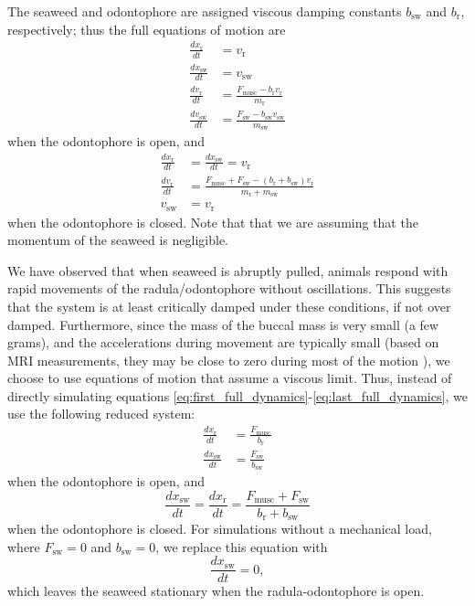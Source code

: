The seaweed and odontophore are assigned viscous damping constants
$b_\textrm{sw}$ and $b_\textrm{r}$, respectively; thus the full equations of motion are
\begin{align}
    \frac{dx_\textrm{r}}{dt} &= v_\textrm{r}\label{eq:first_full_dynamics}\\
    \frac{dx_\textrm{sw}}{dt} &= v_\textrm{sw}\\
    \frac{dv_\textrm{r}}{dt} &= \frac{F_\textrm{musc} - b_\textrm{r} v_\textrm{r}}{m_\textrm{r}}\\
    \frac{dv_\textrm{sw}}{dt} &= \frac{F_\textrm{sw} - b_\textrm{sw} v_\textrm{sw}}{m_\textrm{sw}}
\end{align}
when the odontophore is open, and
\begin{align}
    \frac{dx_\textrm{r}}{dt} &= \frac{dx_\textrm{sw}}{dt} = v_\textrm{r}\\
    \frac{dv_\textrm{r}}{dt} &= \frac{F_\textrm{musc} + F_\textrm{sw} - (b_\textrm{r} + b_\textrm{sw}) v_\textrm{r}}{m_\textrm{r} + m_\textrm{sw}}\\
    v_\textrm{sw} &= v_\textrm{r}\label{eq:last_full_dynamics}
\end{align}
when the odontophore is closed.  Note that that we are assuming that the
momentum of the seaweed is negligible.

We have observed that when seaweed is abruptly pulled, animals respond with
rapid movements of the radula/odontophore without oscillations. This suggests
that the system is at least critically damped under these conditions, if not
over damped. Furthermore, since the mass of the buccal mass is very small (a
few grams), and the accelerations during movement are typically small (based on
MRI measurements, they may be close to zero during most of the motion
\citep{neustadter_kinematics_2002, neustadter_kinematics_2007}), we choose to use equations of motion
that assume a viscous limit. Thus, instead of directly simulating
equations \ref{eq:first_full_dynamics}-\ref{eq:last_full_dynamics}, we
use the following reduced system:
\begin{align}
    \frac{dx_\textrm{r}}{dt} &= \frac{F_\textrm{musc}}{b_\textrm{r}}\label{eq:first_dynamics}\\
    \frac{dx_\textrm{sw}}{dt} &= \frac{F_\textrm{sw}}{b_\textrm{sw}}\label{eq:sw_dynamics}
\end{align}
when the odontophore is open, and
\begin{equation}
    \frac{dx_\textrm{sw}}{dt} = \frac{dx_\textrm{r}}{dt} = \frac{F_\textrm{musc} + F_\textrm{sw}}{b_\textrm{r} + b_\textrm{sw}}
    \label{eq:last_dynamics}
\end{equation}
when the odontophore is closed.  For simulations without a mechanical load,
where $F_\textrm{sw}=0$ and $b_\textrm{sw}=0$, we replace this equation with
\begin{equation}
    \frac{dx_\textrm{sw}}{dt} = 0,
\end{equation}
which leaves the seaweed stationary when the radula-odontophore is open.

